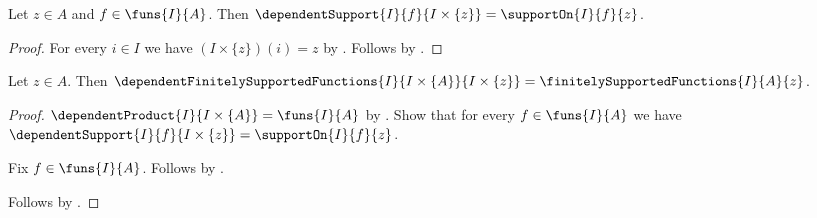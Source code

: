 \begin{theorem}\label{spike_constant_family_support}
    Let $z\in A$ and $f\in\funs{I}{A}$.
    Then
        $\dependentSupport{I}{f}{I\times\{z\}}
            =\supportOn{I}{f}{z}$.
\end{theorem}
\begin{proof}
    For every $i\in I$ we have $(I\times\{z\})(i)=z$ by
        .
    Follows by
        .
\end{proof}

\begin{theorem}\label{spike_constant_family_finite_support_space}
    Let $z\in A$.
    Then
        $\dependentFinitelySupportedFunctions
            {I}{I\times\{A\}}{I\times\{z\}}
        =\finitelySupportedFunctions{I}{A}{z}$.
\end{theorem}
\begin{proof}
    $\dependentProduct{I}{I\times\{A\}}=\funs{I}{A}$ by
        .
    Show that for every $f\in\funs{I}{A}$ we have
        $\dependentSupport{I}{f}{I\times\{z\}}
            =\supportOn{I}{f}{z}$.
    \begin{subproof}
        Fix $f\in\funs{I}{A}$.
        Follows by .
    \end{subproof}
    Follows by
        .
\end{proof}

